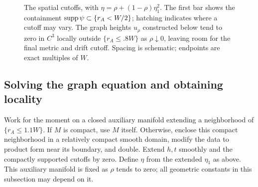 \begin{figure}[tbp]
\centering
{}
\caption{The spatial cutoffs, with $\eta=\rho+(1-\rho)\eta_1^2$.
The first bar shows the containment $\operatorname{supp}\psi\subset\{r_A<W/2\}$;
hatching indicates where a cutoff may vary.  The graph heights $u_\rho$
constructed below tend to zero in $C^3$ locally outside
$\{r_A\le.8W\}$ as $\rho\downarrow0$, leaving room for the final metric
and drift cutoff.  Spacing is schematic; endpoints are exact multiples of $W$.}
\label{stretch:figure}
\end{figure}

\subsection{Solving the graph equation and obtaining locality}
\label{stretch:equation}

Work for the moment on a closed auxiliary manifold extending a
neighborhood of $\{r_A\le1.1W\}$.  If $M$ is compact, use $M$ itself.
Otherwise, enclose this compact neighborhood in a relatively compact
smooth domain, modify the data to product form near its boundary, and
double.  Extend $h,t$ smoothly and the compactly supported cutoffs by
zero.  Define $\eta$ from the extended $\eta_1$ as above.  This auxiliary
manifold is fixed as $\rho$ tends to zero; all geometric constants in this
subsection may depend on it.

